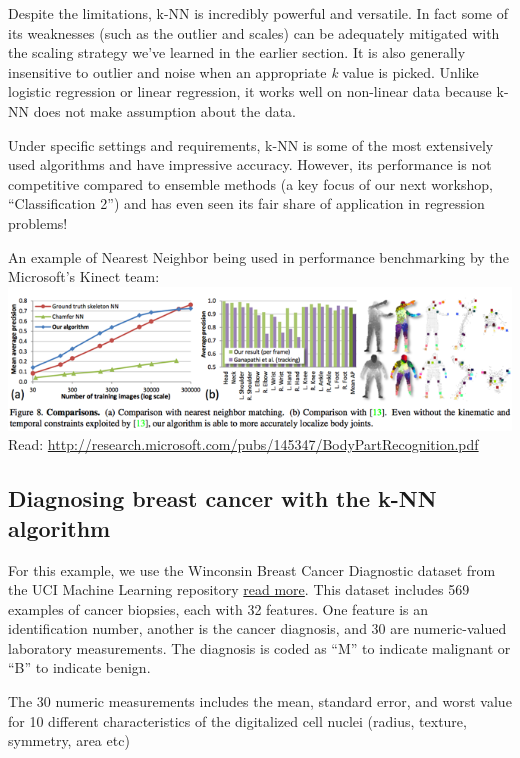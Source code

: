 \documentclass[
]{article}
\begin{document}
Despite the limitations, k-NN is incredibly powerful and versatile. In
fact some of its weaknesses (such as the outlier and scales) can be
adequately mitigated with the scaling strategy we've learned in the
earlier section. It is also generally insensitive to outlier and noise
when an appropriate \emph{k} value is picked. Unlike logistic regression
or linear regression, it works well on non-linear data because k-NN does
not make assumption about the data.

Under specific settings and requirements, k-NN is some of the most
extensively used algorithms and have impressive accuracy. However, its
performance is not competitive compared to ensemble methods (a key focus
of our next workshop, ``Classification 2'') and has even seen its fair
share of application in regression problems!

An example of Nearest Neighbor being used in performance benchmarking by
the Microsoft's Kinect team: \includegraphics{assets/kinect.png} Read:
\url{http://research.microsoft.com/pubs/145347/BodyPartRecognition.pdf}

\hypertarget{diagnosing-breast-cancer-with-the-k-nn-algorithm}{%
\subsection{Diagnosing breast cancer with the k-NN
algorithm}\label{diagnosing-breast-cancer-with-the-k-nn-algorithm}}

For this example, we use the Winconsin Breast Cancer Diagnostic dataset
from the UCI Machine Learning repository
\href{http://pubsonline.informs.org/doi/abs/10.1287/opre.43.4.570?journalCode=opre}{read
more}. This dataset includes 569 examples of cancer biopsies, each with
32 features. One feature is an identification number, another is the
cancer diagnosis, and 30 are numeric-valued laboratory measurements. The
diagnosis is coded as ``M'' to indicate malignant or ``B'' to indicate
benign.

The 30 numeric measurements includes the mean, standard error, and worst
value for 10 different characteristics of the digitalized cell nuclei
(radius, texture, symmetry, area etc)
\end{document}
